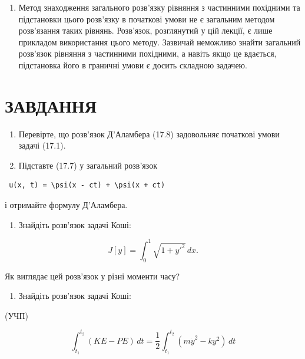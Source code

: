 \documentclass[
  ukrainian,
]{article}
\providecommand{\tightlist}{%
  \setlength{\itemsep}{0pt}\setlength{\parskip}{0pt}}
\begin{document}
\begin{enumerate}
\def\labelenumi{\arabic{enumi}.}
\setcounter{enumi}{2}
\tightlist
\item
  Метод знаходження загального розв'язку рівняння з частинними похідними
  та підстановки цього розв'язку в початкові умови не є загальним
  методом розв'язання таких рівнянь. Розв'язок, розглянутий у цій
  лекції, є лише прикладом використання цього методу. Зазвичай неможливо
  знайти загальний розв'язок рівняння з частинними похідними, а навіть
  якщо це вдається, підстановка його в граничні умови є досить складною
  задачею.
\end{enumerate}

\section{ЗАВДАННЯ}\label{ux437ux430ux432ux434ux430ux43dux43dux44f-12}

\begin{enumerate}
\def\labelenumi{\arabic{enumi}.}
\item
  Перевірте, що розв'язок Д'Аламбера (17.8) задовольняє початкові умови
  задачі (17.1).
\item
  Підставте (17.7) у загальний розв'язок
\end{enumerate}

\begin{verbatim}
 u(x, t) = \psi(x - ct) + \psi(x + ct) 
\end{verbatim}

і отримайте формулу Д'Аламбера.

\begin{enumerate}
\def\labelenumi{\arabic{enumi}.}
\setcounter{enumi}{2}
\tightlist
\item
  Знайдіть розв'язок задачі Коші:
\end{enumerate}

\[
J[y] = \int_{0}^{1} \sqrt{1 + y'^{2}}\,dx.
\]

Як виглядає цей розв'язок у різні моменти часу?

\begin{enumerate}
\def\labelenumi{\arabic{enumi}.}
\setcounter{enumi}{3}
\tightlist
\item
  Знайдіть розв'язок задачі Коші:
\end{enumerate}

(УЧП)

\[
\int_{t_{1}}^{t_{2}} (KE - PE)\,dt = \frac{1}{2} \int_{t_{1}}^{t_{2}} (m\dot{y}^{2} - ky^{2})\,dt
\]
\end{document}
